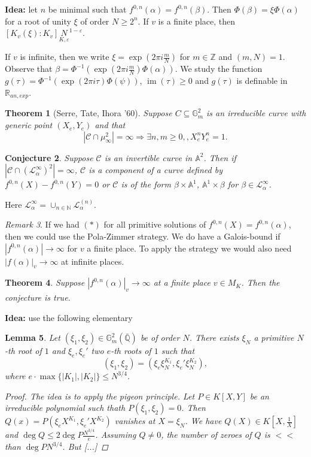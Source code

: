 \documentclass[12pt]{article}
\theoremstyle{darkgreentheorem}
\newtheorem{thm}{Theorem}
\newtheorem{lm}[thm]{Lemma}
\newtheorem{conj}[thm]{Conjecture}
\theoremstyle{darkbluedefinition}
\theoremstyle{darkredexample}
\theoremstyle{remark}
\newtheorem{rem}[thm]{Remark}
\newcommand{\N}{\mathbb{N}}
\newcommand{\Z}{\mathbb{Z}}
\newcommand{\Q}{\mathbb{Q}}
\newcommand{\R}{\mathbb{R}}
\newcommand{\1}{\mathbbm{1}}
\newcommand{\Gm}{\mathbb{G}_{m}}
\newcommand{\bbA}{\mathbb{A}}
\newcommand{\calC}{\mathcal{C}}
\renewcommand{\L}{\mathcal{L}}
\DeclareMathOperator{\im}{im}
\newcommand{\sub}{\subseteq}
\begin{document}
\textbf{Idea:} let $n$ be minimal such that $f^{0,n}(\alpha)=f^{0,n}(\beta)$.
Then $\Phi(\beta)=\xi \Phi(\alpha)$ for a root of unity $\xi$ of order $N\geqslant 2^{n}$.
If $v$ is a finite place, then $[K_{v}(\xi):K_{v}]\underset{K,\varepsilon} N^{1-\varepsilon}$.

If $v$ is infinite, then we write $\xi=\exp(2\pi i\frac{m}{N})$ for $m\in \Z$ and $(m,N)=1$.
Observe that $\beta=\Phi^{-1}(\exp(2\pi i\frac{m}{N})\Phi(\alpha))$.
We study the function $g(\tau)=\Phi^{-1}(\exp(2\pi i\tau)\Phi(\psi))$, $\im(\tau)\geqslant 0$ and $g(\tau)$ is definable in $\R_{an,exp}$.

\begin{thm}[Serre, Tate, Ihora '60]
    Suppose $C\sub\Gm^{2}$ is an irreducible curve with generic point $(X_{e},Y_{e})$ and that
    \[ |\calC\cap \mu_{\infty}^{2} |=\infty \Rightarrow \exists n,m\geqslant 0,,X_{e}^{n}Y_{e}^{n}=1.\]
\end{thm}

\begin{conj}
    Suppose $\calC$ is an invertible curve in $\bbA^{2}$.
    Then if $|\calC\cap (\L_{\alpha}^{\infty})^{2}|=\infty$, $\calC$ is a component of a curve defined by $f^{0,n}(X)-f^{0,n}(Y)=0$ or $\calC$ is of the form $\beta\times \bbA^{1}$, $\bbA^{1}\times \beta$ for $\beta\in\L_{\alpha}^{\infty}$.
\end{conj}

Here $\L_{\alpha}^{\infty}=\cup_{n\in\N}\L_{\alpha}^{(n)}$.

\begin{rem}
    If we had $(*)$ for all primitive solutions of $f^{0,n}(X)=f^{0,n}(\alpha)$, then we could use the Pola-Zimmer strategy.
    We do have a Galois-bound if $|f^{0,n}(\alpha)|\to \infty$ for $v$ a finite place.
    To apply the strategy we would also need $|f(\alpha)|_{v}\to \infty$ at infinite places.
\end{rem}

\begin{thm}
    Suppose $|f^{0,n}(\alpha)|_{v}\to \infty$ at a finite place $v\in M_{K}$.
    Then the conjecture is true.
\end{thm}

\textbf{Idea:} use the following elementary
\begin{lm}
    Let $(\xi_{1},\xi_{2})\in \Gm^{2}(\bar{\Q})$ be of order $N$.
    There exists $\xi_{N}$ a primitive $N$-th root of $1$ and $\xi_{e},\xi_{e}'$ two $e$-th roots of $1$ such that
    \[ (\xi_{1},\xi_{2})=(\xi_{e}\xi_{N}^{K_{1}},\xi_{e}'\xi_{N}^{K_{2}}), \]
    where $e\cdot \max\{|K_{1}|,|K_{2}|\}\leqslant N^{3/4}$.
    \begin{proof}
	The idea is to apply the pigeon principle.
	Let $P\in K[X,Y]$ be an irreducible polynomial such thath $P(\xi_{1},\xi_{2})=0$.
	Then $Q(x)=P(\xi_{e}X^{K_{1}},\xi_{e}'X^{K_{2}})$ vanishes at $X=\xi_{N}$.
	We have $Q(X)\in K[X,\frac{1}{X}]$ and $\deg{Q}\leqslant 2\deg{P}\frac{N^{3/4}}{e}$.
	Assuming $Q\neq 0$, the number of zeroes of $Q$ is $<<$ than $\deg{P}N^{3/4}$.
	But [...]
    \end{proof}
\end{lm}
\end{document}
